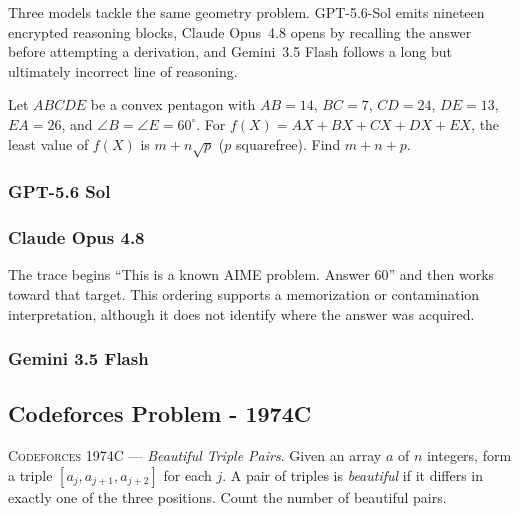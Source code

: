 Three models tackle the same geometry problem. GPT-5.6-Sol emits nineteen
encrypted reasoning blocks, Claude Opus~4.8 opens by recalling the answer before
attempting a derivation, and Gemini~3.5 Flash follows a long but ultimately
incorrect line of reasoning.

\begin{decodedpromptpanel}
Let $ABCDE$ be a convex pentagon with $AB{=}14$, $BC{=}7$, $CD{=}24$,
$DE{=}13$, $EA{=}26$, and $\angle B{=}\angle E{=}60^\circ$. For
$f(X){=}AX{+}BX{+}CX{+}DX{+}EX$, the least value of $f(X)$ is
$m{+}n\sqrt p$ ($p$ squarefree). Find $m{+}n{+}p$.
\end{decodedpromptpanel}

\subsubsection{GPT-5.6 Sol}
\label{app:decoded_aime_sol}



\subsubsection{Claude Opus 4.8}
\label{app:decoded_aime_opus}

The trace begins ``This is a known AIME problem. Answer 60'' and then works toward
that target. This ordering supports a memorization or contamination interpretation,
although it does not identify where the answer was acquired.



\subsubsection{Gemini 3.5 Flash}
\label{app:decoded_aime_gemini}



\clearpage
\subsection{Codeforces Problem - 1974C}
\label{app:decoded_codeforces}

\begin{decodedpromptpanel}
\textsc{Codeforces 1974C} --- \emph{Beautiful Triple Pairs}. Given an array $a$
of $n$ integers, form a triple $[a_j,a_{j+1},a_{j+2}]$ for each $j$. A pair of
triples is \emph{beautiful} if it differs in exactly one of the three positions.
Count the number of beautiful pairs.
\end{decodedpromptpanel}

